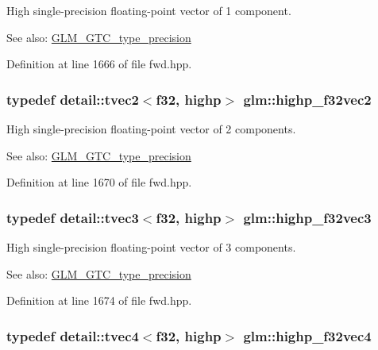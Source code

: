 High single-precision floating-point vector of 1 component. \begin{Desc}
\item[See also:]\hyperlink{group__gtc__type__precision}{GLM\_\-GTC\_\-type\_\-precision} \end{Desc}


Definition at line 1666 of file fwd.hpp.\hypertarget{group__gtc__type__precision_gbba3e1b3ae0bcaa7aaac573c08c2f8d3}{
\subsubsection[highp\_\-f32vec2]{\setlength{\rightskip}{0pt plus 5cm}typedef detail::tvec2$<$f32, highp$>$ {\bf glm::highp\_\-f32vec2}}}
\label{group__gtc__type__precision_gbba3e1b3ae0bcaa7aaac573c08c2f8d3}


High single-precision floating-point vector of 2 components. \begin{Desc}
\item[See also:]\hyperlink{group__gtc__type__precision}{GLM\_\-GTC\_\-type\_\-precision} \end{Desc}


Definition at line 1670 of file fwd.hpp.\hypertarget{group__gtc__type__precision_g581a4a4eb1f3a269d16af0c4e2d8daf4}{
\subsubsection[highp\_\-f32vec3]{\setlength{\rightskip}{0pt plus 5cm}typedef detail::tvec3$<$f32, highp$>$ {\bf glm::highp\_\-f32vec3}}}
\label{group__gtc__type__precision_g581a4a4eb1f3a269d16af0c4e2d8daf4}


High single-precision floating-point vector of 3 components. \begin{Desc}
\item[See also:]\hyperlink{group__gtc__type__precision}{GLM\_\-GTC\_\-type\_\-precision} \end{Desc}


Definition at line 1674 of file fwd.hpp.\hypertarget{group__gtc__type__precision_g53d3c1a17e2e6f26ee5ad1e8879d710e}{
\subsubsection[highp\_\-f32vec4]{\setlength{\rightskip}{0pt plus 5cm}typedef detail::tvec4$<$f32, highp$>$ {\bf glm::highp\_\-f32vec4}}}
\label{group__gtc__type__precision_g53d3c1a17e2e6f26ee5ad1e8879d710e}


